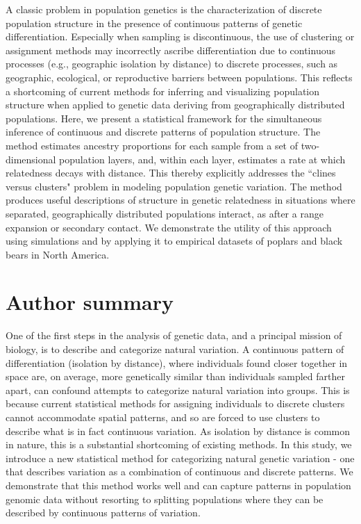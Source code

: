 \documentclass[10pt,letterpaper]{article}
\newif\ifsubmissionversion
\begin{document}
A classic problem in population genetics is the characterization 
of discrete population structure in the presence of 
continuous patterns of genetic differentiation.
Especially when sampling is discontinuous, 
the use of clustering or assignment methods may incorrectly ascribe
differentiation due to continuous processes (e.g., geographic isolation by distance)
to discrete processes, such as geographic, ecological, or reproductive barriers 
between populations.
This reflects a shortcoming of current methods for inferring and 
visualizing population structure when applied to genetic data
deriving from geographically distributed populations.
Here, we present a statistical framework for the simultaneous inference 
of continuous and discrete patterns of population structure.
The method estimates ancestry proportions for each 
sample from a set of two-dimensional population layers, 
and, within each layer, estimates a rate at which relatedness decays with distance.
This thereby explicitly addresses the ``clines versus clusters" problem in 
modeling population genetic variation.
The method produces useful descriptions of structure in genetic relatedness
in situations where separated, geographically distributed populations interact,
as after a range expansion or secondary contact.
We demonstrate the utility of this approach using simulations 
and by applying it to empirical datasets of poplars and black bears in North America.

\ifsubmissionversion
\newpage
\fi


\section*{Author summary}
One of the first steps in the analysis of genetic data, 
and a principal mission of biology, 
is to describe and categorize natural variation. 
A continuous pattern of differentiation (isolation by distance), 
where individuals found closer together in space 
are, on average, more genetically similar than individuals sampled farther apart, 
can confound attempts to categorize natural variation into groups.  
This is because current statistical methods for assigning individuals to discrete clusters 
cannot accommodate spatial patterns, 
and so are forced to use clusters to describe what is in fact
continuous variation. 
As isolation by distance is common in nature, 
this is a substantial shortcoming of existing methods.
In this study, we introduce a new statistical method 
for categorizing natural genetic variation - 
one that describes variation as a combination of continuous and discrete patterns.
We demonstrate that this method works well and can capture patterns in
population genomic data without resorting to splitting populations
where they can be described by continuous patterns of variation.
\end{document}
